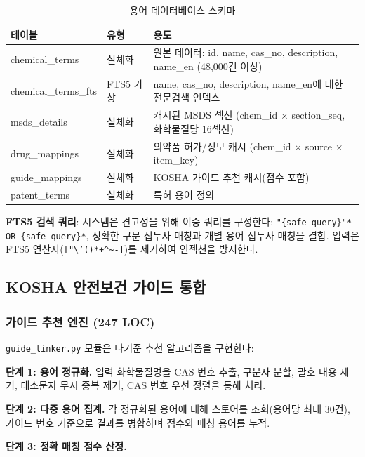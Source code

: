 \documentclass[preprint,12pt]{elsarticle}
\begin{document}
\begin{table}[H]
\centering
\caption{용어 데이터베이스 스키마}
\label{tab:termdb}
\small
\begin{tabular}{@{}llp{6cm}@{}}
\toprule
\textbf{테이블} & \textbf{유형} & \textbf{용도} \\
\midrule
chemical\_terms & 실체화 & 원본 데이터: id, name, cas\_no, description, name\_en (48,000건 이상) \\
chemical\_terms\_fts & FTS5 가상 & name, cas\_no, description, name\_en에 대한 전문검색 인덱스 \\
msds\_details & 실체화 & 캐시된 MSDS 섹션 (chem\_id $\times$ section\_seq, 화학물질당 16섹션) \\
drug\_mappings & 실체화 & 의약품 허가/정보 캐시 (chem\_id $\times$ source $\times$ item\_key) \\
guide\_mappings & 실체화 & KOSHA 가이드 추천 캐시(점수 포함) \\
patent\_terms & 실체화 & 특허 용어 정의 \\
\bottomrule
\end{tabular}
\end{table}

\textbf{FTS5 검색 쿼리}: 시스템은 견고성을 위해 이중 쿼리를 구성한다: \texttt{"\{safe\_query\}"* OR \{safe\_query\}*}, 정확한 구문 접두사 매칭과 개별 용어 접두사 매칭을 결합. 입력은 FTS5 연산자(\texttt{["\textbackslash'()*+\textasciicircum\textasciitilde-]})를 제거하여 인젝션을 방지한다.

\subsection{KOSHA 안전보건 가이드 통합}
\label{sec:guides}

\subsubsection{가이드 추천 엔진 (247 LOC)}

\texttt{guide\_linker.py} 모듈은 다기준 추천 알고리즘을 구현한다:

\textbf{단계 1: 용어 정규화.} 입력 화학물질명을 CAS 번호 추출, 구분자 분할, 괄호 내용 제거, 대소문자 무시 중복 제거, CAS 번호 우선 정렬을 통해 처리.

\textbf{단계 2: 다중 용어 집계.} 각 정규화된 용어에 대해 스토어를 조회(용어당 최대 30건), 가이드 번호 기준으로 결과를 병합하며 점수와 매칭 용어를 누적.

\textbf{단계 3: 정확 매칭 점수 산정.}
\end{document}
